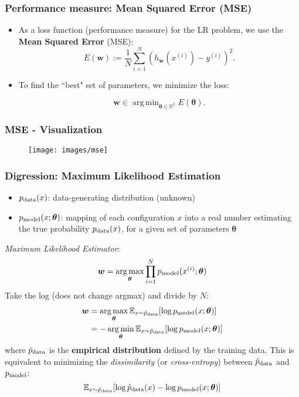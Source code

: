 \documentclass{beamer}
\DeclareMathOperator*{\argmax}{arg\,max}
\DeclareMathOperator*{\argmin}{arg\,min}
\begin{document}
	\begin{frame}
		\frametitle{Performance measure: Mean Squared Error (MSE)}
		\begin{itemize}
			\item As a loss function (performance measure) for the LR problem, we use the \textbf{Mean Squared Error} (MSE):
			$$E({\bm{w}}) := \frac{1}{N} \sum_{i=1}^{N} (h_{\bm{w}}(x^{(i)}) - y^{(i)})^2.$$
			\item To find the ``best" set of parameters, we minimize the loss:
			
			$$\bm{w} \in \argmin_{\bm{\theta} \in \mathbb{R}^2} E(\bm{\theta}).$$
		\end{itemize}
	\end{frame}

	\begin{frame}
		\frametitle{MSE - Visualization}
		\begin{figure}
			\centering
			\texttt{[image: images/mse]}
		\end{figure}
	\end{frame}
	
	\begin{frame}
		\frametitle{Digression: Maximum Likelihood Estimation}
		\begin{itemize}
			\item $p_{\rm data}(x)$: data-generating distribution (unknown)
			\item $p_{\rm model}(x; \bm{\theta})$: mapping of each configuration $x$ into a real number estimating the true probability $p_{\rm data}(x)$, for a given set of parameters $\bm{\theta}$
		\end{itemize}	
		\vspace{2mm}
		\textit{Maximum Likelihood Estimator}:
		$$ \bm{w} = \argmax_{\bm{\theta}} \prod_{i=1}^{N} p_{\rm model}(x^{(i)}; \bm{\theta}) $$
		Take the log (does not change argmax) and divide by $N$:
		\begin{align*}
			\bm{w} &= \argmax_{\bm{\theta}}\mathbb{E}_{x \sim \hat{p}_{\rm data}} [\log p_{\rm model}(x; \bm{\theta})] \\
			&= -\argmin_{\bm{\theta}}\mathbb{E}_{x \sim \hat{p}_{\rm data}} [\log p_{\rm model}(x; \bm{\theta})]
		\end{align*} 
		where $\hat{p}_{\rm data}$ is the \textbf{empirical distribution} defined by the training data.
		This is equivalent to minimizing the \textit{dissimilarity} (or \textit{cross-entropy}) between $ \hat{p}_{\rm data}$ and $p_{\rm model}$:
		$$ \mathbb{E}_{x \sim \hat{p}_{\rm data}} [\log \hat{p}_{\rm data}(x)-\log p_{\rm model}(x; \bm{\theta})] $$
	\end{frame}
	
\end{document}
